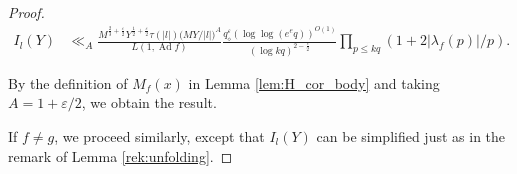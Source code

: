 \documentclass[12pt,reqno]{amsart}
\theoremstyle{remark}
\DeclareMathOperator{\ad}{Ad}
\numberwithin{equation}{section}
\begin{document}
\begin{proof}
            \begin{equation*}
			\begin{aligned}
			I_l(Y) 	&\ll_{A} \frac{M^{\frac{2}{3}+{\frac{\varepsilon}{2}} }Y^{\frac{1}{2}+{\frac{\varepsilon}{2} }}\tau(|l|)\big(MY/|l|\big)^A}{L(1, \ad f)} \frac{q_\diamond^{\varepsilon} (\log\log(e^eq))^{O(1)}}{(\log kq)^{2-{\frac{\varepsilon}{2}} }} \prod_{p \le kq}(1+2|\lambda_f(p)|/p).
			\end{aligned}
		\end{equation*}
        
       By the definition of $M_f(x)$ in Lemma \ref{lem:H_cor_body} and taking $A = 1+\varepsilon/2$, we obtain the  result.
  
    If $f \neq g$, we proceed similarly, except that $I_l(Y)$ can be simplified just as in the remark of Lemma \ref{rek:unfolding}.
        \end{proof}
        
\end{document}
